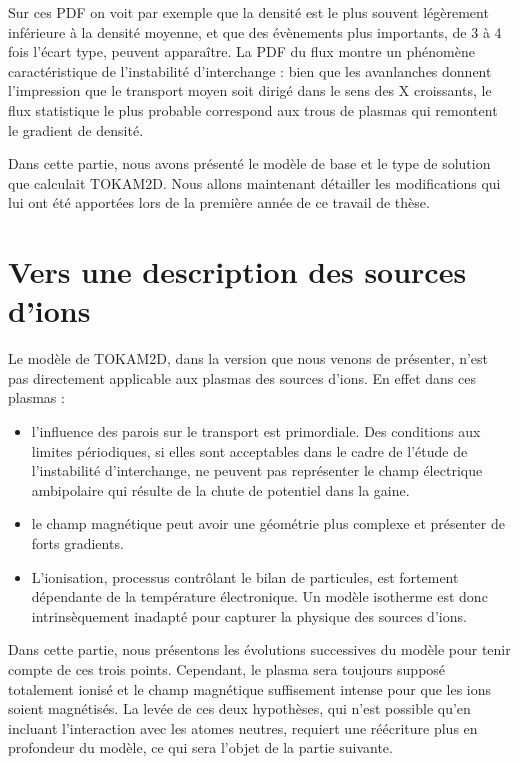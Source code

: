 \begin{refsection}
Sur ces PDF on voit par exemple que la densité est le plus souvent
légèrement inférieure à la densité moyenne, et que des évènements plus
importants, de 3 à 4 fois l'écart type, peuvent apparaître. La PDF du flux
montre un phénomène caractéristique de l'instabilité d'interchange : bien que
les avanlanches donnent l'impression que le transport moyen soit dirigé dans
le sens des X croissants, le flux statistique le plus probable correspond aux
trous de plasmas qui remontent le gradient de densité.

Dans cette partie, nous avons présenté le modèle de base et le type
de solution que calculait TOKAM2D. Nous allons maintenant détailler les
modifications qui lui ont été apportées lors de la première année de ce travail
de thèse.

\section{Vers une description des sources d'ions}

Le modèle de TOKAM2D, dans la version que nous venons de présenter, n'est pas
directement applicable aux plasmas des sources d'ions. En effet dans
ces plasmas :

\begin{itemize}
	\item l'influence des parois sur le transport est primordiale. Des conditions
	aux limites périodiques, si elles sont acceptables dans le cadre de l'étude de
	l'instabilité d'interchange, ne peuvent pas représenter le champ électrique
	ambipolaire qui résulte de la chute de potentiel dans la gaine.
	\item le champ magnétique peut avoir une géométrie plus complexe et présenter
	de forts gradients.
	\item L'ionisation, processus contrôlant le bilan de particules, est fortement
	dépendante de la température électronique. Un modèle isotherme est donc
	intrinsèquement inadapté pour capturer la physique des sources d'ions.
\end{itemize}

Dans cette partie, nous présentons les évolutions successives du modèle pour
tenir compte de ces trois points. Cependant, le plasma sera toujours supposé
totalement ionisé et le champ magnétique suffisement intense pour que les
ions soient magnétisés. La levée de ces deux hypothèses, qui n'est possible
qu'en incluant l'interaction avec les atomes neutres, requiert une réécriture
plus en profondeur du modèle, ce qui sera l'objet de la partie suivante.


\end{refsection}

